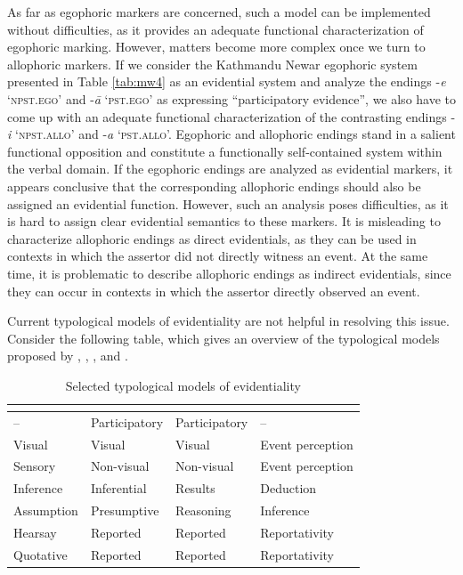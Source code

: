 \documentclass[output=paper]{langsci/langscibook}
\begin{document}
As far as egophoric markers are concerned, such a model can be implemented without difficulties, as it provides an adequate functional characterization of egophoric marking. However, matters become more complex once we turn to allophoric markers. If we consider the Kathmandu Newar egophoric system presented in Table \ref{tab:mw4} as an evidential system and analyze the endings -\textit{e} ‘\textsc{npst.ego}’ and -\textit{ā} ‘\textsc{pst.ego}’ as expressing “participatory evidence”, we also have to come up with an adequate functional characterization of the contrasting endings -\textit{i} ‘\textsc{npst.allo}’ and -\textit{a} ‘\textsc{pst.allo}’. Egophoric and allophoric endings stand in a salient functional opposition and constitute a functionally self-contained system within the verbal domain. If the egophoric endings are analyzed as evidential markers, it appears conclusive that the corresponding allophoric endings should also be assigned an evidential function. However, such an analysis poses difficulties, as it is hard to assign clear evidential semantics to these markers. It is misleading to characterize allophoric endings as direct evidentials, as they can be used in contexts in which the assertor did not directly witness an event. At the same time, it is problematic to describe allophoric endings as indirect evidentials, since they can occur in contexts in which the assertor directly observed an event.

Current typological models of evidentiality are not helpful in resolving this issue. Consider the following table, which gives an overview of the typological models proposed by \cite{Aikhenvald2004}, \cite{Plungian2010}, \cite{SanRoqueLoughnane2012}, and \cite{Hengeveld2015}.

\begin{table}
\begin{tabularx}{.90\textwidth}{XXXX}
\hline
\textbf{\cite{Aikhenvald2004}}	&	\textbf{\cite{Plungian2010}}	&	\textbf{\cite{SanRoqueLoughnane2012}}	&	\textbf{\cite{Hengeveld2015}}	\\
\hline
–	&	Participatory	&	Participatory	&	–	\\
Visual	&	Visual	&	Visual	&	Event perception	\\
Sensory	&	Non-visual	&	Non-visual	&	Event perception	\\
Inference	&	Inferential	&	Results	&	Deduction	\\
Assumption	&	Presumptive	&	Reasoning	&	Inference	\\
Hearsay	&	Reported	&	Reported	&	Reportativity	\\
Quotative	&	Reported	&	Reported	&	Reportativity	\\
\hline
\end{tabularx}
\caption{Selected typological models of evidentiality}
\label{tab:mw6}
\end{table}
\end{document}
